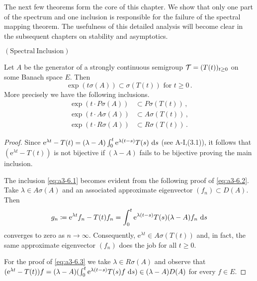 The next few theorems form the core of this chapter. 
We show that only one part of the spectrum and one inclusion is responsible for the failure of the spectral mapping theorem.
The usefulness of this detailed analysis will become clear in the subsequent chapters on stability and asymptotics.
\begin{proposition}{$\mathrm{(Spectral\ Inclusion)}$}
	\label{prop:a3-6.2}
	
Let $A$ be the generator of a strongly continuous semigroup $\mathcal{T} = (T(t))_{t \geq 0}$ on some Banach space $E$.
Then
\[
\exp(t\sigma(A)) \subset \sigma(T(t)) \text{ for } t \geq 0\,.
\]
More precisely we have the following inclusions.
\begin{align}
\exp(t \cdot P\sigma(A)) &\subset P\sigma(T(t)) \label{eq:a3-6.1}\,, \\
\exp(t \cdot A\sigma(A)) &\subset A\sigma(T(t)) \label{eq:a3-6.2}\,, \\
\exp(t \cdot R\sigma(A)) &\subset R\sigma(T(t)) \label{eq:a3-6.3}\,.
\end{align}
\end{proposition}
\begin{proof}
Since $\mathrm{e}^{\lambda t} - T(t) = (\lambda - A)\int_{0}^{t} \mathrm{e}^{\lambda(t-s)}T(s) \, \mathop{}\!\mathrm{d}{s}$ (see A-I,(3.1)), it follows that $(\mathrm{e}^{\lambda t} - T(t))$ is not bijective if $(\lambda - A)$ fails to be bijective proving the main inclusion.

The inclusion \eqref{eq:a3-6.1} becomes evident from the following proof of \eqref{eq:a3-6.2}. Take $\lambda \in A\sigma(A)$ and an associated approximate eigenvector $(f_{n}) \subset D(A)$.
Then
\[
g_{n} \coloneqq \mathrm{e}^{\lambda t}f_{n} - T(t)f_{n} = \int_{0}^{t} \mathrm{e}^{\lambda(t-s)}T(s)(\lambda-A)f_{n} \, \mathop{}\!\mathrm{d}{s}
\]
converges to zero as $n \to \infty$.
Consequently, $\mathrm{e}^{\lambda t} \in A\sigma(T(t))$ and, in fact, the same approximate eigenvector $(f_{n})$ does the job for all $t \geq 0$.

For the proof of \eqref{eq:a3-6.3} we take $\lambda \in R\sigma(A)$ and observe that $(\mathrm{e}^{\lambda t} - T(t))f = (\lambda - A)(\int_{0}^{t} \mathrm{e}^{\lambda(t-s)}T(s)f \, \mathop{}\!\mathrm{d}{s}) \in (\lambda - A)D(A)$ for every $f \in E$.
\end{proof}
